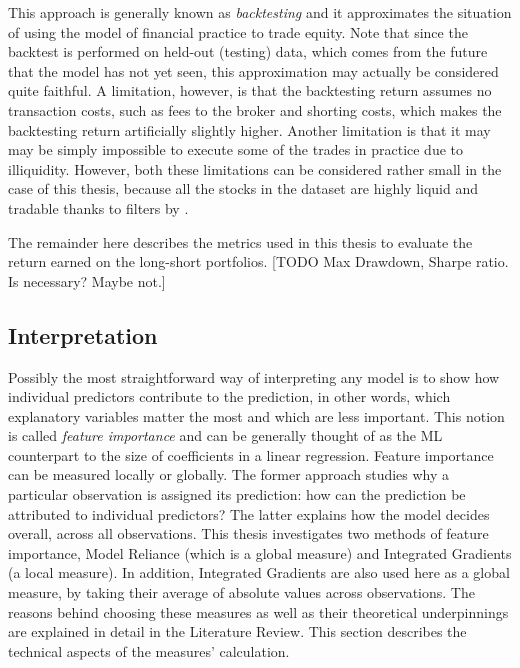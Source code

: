 			This approach is generally known as \textit{backtesting} and it approximates the situation of using the model of financial practice to trade equity. Note that since the backtest is performed on held-out (testing) data, which comes from the future that the model has not yet seen, this approximation may actually be considered quite faithful. A limitation, however, is that the backtesting return assumes no transaction costs, such as fees to the broker and shorting costs, which makes the backtesting return artificially slightly higher. Another limitation is that it may may be simply impossible to execute some of the trades in practice  due to illiquidity. However, both these limitations can be considered rather small in the case of this thesis, because all the stocks in the dataset are highly liquid and tradable thanks to filters by \cite{tobek2020does}. 
			
			The remainder here describes the metrics used in this thesis to evaluate the return earned on the long-short portfolios. [TODO Max Drawdown, Sharpe ratio. Is necessary? Maybe not.]
	
	
	\subsection{Interpretation}
	
		Possibly the most straightforward way of interpreting any model is to show how individual predictors contribute to the prediction, in other words, which explanatory variables matter the most and which are less important. This notion is called \textit{feature importance} and can be generally thought of as the ML counterpart to the size of coefficients in a linear regression. Feature importance can be measured locally or globally. The former approach studies why a particular observation is assigned its prediction: how can the prediction be attributed to individual predictors? The latter explains how the model decides overall, across all observations. This thesis investigates two methods of feature importance, Model Reliance \citep{fisher2019all} (which is a global measure) and Integrated Gradients \citep{sundararajan2017axiomatic} (a local measure). In addition, Integrated Gradients are also used here as a global measure, by taking their average of absolute values across observations. The reasons behind choosing these measures as well as their theoretical underpinnings are explained in detail in the Literature Review. This section describes the technical aspects of the measures' calculation.
		
